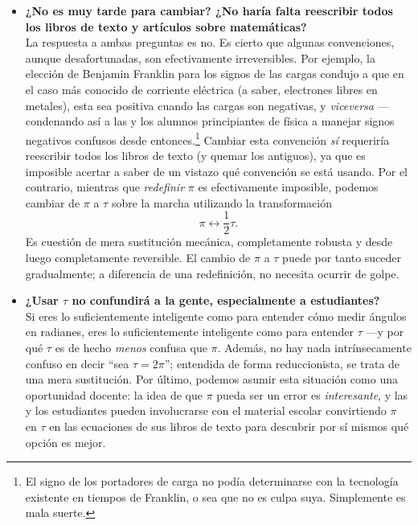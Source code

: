 \begin{itemize}
  \item \textbf{¿No es muy tarde para cambiar? ¿No haría falta reescribir todos los libros de texto y artículos sobre matemáticas?} \\ La respuesta a ambas preguntas es no. Es cierto que algunas convenciones, aunque desafortunadas, son efectivamente irreversibles. Por ejemplo, la elección de Benjamin Franklin para los signos de las cargas condujo a que en el caso más conocido de corriente eléctrica (a saber, electrones libres en metales), esta sea positiva cuando las cargas son negativas, y \emph{viceversa} ---condenando así a las y los alumnos principiantes de física a manejar signos negativos confusos desde entonces.\footnote{El signo de los portadores de carga no podía determinarse con la tecnología existente en tiempos de Franklin, o sea que no es culpa suya. Simplemente es mala suerte.} Cambiar esta convención \emph{sí} requeriría reescribir todos los libros de texto (y quemar los antiguos), ya que es imposible acertar a saber de un vistazo qué convención se está usando. Por el contrario, mientras que \emph{redefinir} $\pi$ es efectivamente imposible, podemos cambiar de $\pi$ a $\tau$ sobre la marcha utilizando la transformación \[ \pi \leftrightarrow \textstyle{\frac{1}{2}}\tau. \] Es cuestión de mera sustitución mecánica, completamente robusta y desde luego completamente reversible. El cambio de  $\pi$ a $\tau$ puede por tanto suceder gradualmente; a diferencia de una redefinición, no necesita ocurrir de golpe.

  \item \textbf{¿Usar $\tau$ no confundirá a la gente, especialmente a estudiantes?} \\  Si eres lo suficientemente inteligente como para entender cómo medir ángulos en radianes, eres lo suficientemente inteligente como para entender $\tau$ ---y por qué $\tau$ es de hecho \emph{menos} confusa que $\pi$. Además, no hay nada intrínsecamente confuso en decir ``sea $\tau = 2\pi$''; entendida de forma reduccionista, se trata de una mera sustitución. Por último, podemos asumir esta situación como una oportunidad docente: la idea de que $\pi$ pueda ser un error es \emph{interesante}, y las y los estudiantes pueden involucrarse con el material escolar convirtiendo $\pi$ en $\tau$ en las ecuaciones de sus libros de texto para descubrir por sí mismos qué opción es mejor.



\end{itemize}
